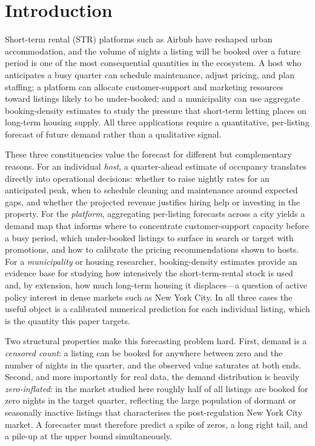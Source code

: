 \documentclass[review,12pt]{elsarticle}
\begin{document}
\linenumbers

\section{Introduction}
Short-term rental (STR) platforms such as Airbnb have reshaped
urban accommodation, and the volume of nights a listing will be booked over a
future period is one of the most consequential quantities in the ecosystem. A
host who anticipates a busy quarter can schedule maintenance, adjust pricing, and
plan staffing; a platform can allocate customer-support and marketing resources
toward listings likely to be under-booked; and a municipality can use aggregate
booking-density estimates to study the pressure that short-term letting places on
long-term housing supply. All three applications require a quantitative,
per-listing forecast of future demand rather than a qualitative signal.

These three constituencies value the forecast for different but complementary
reasons. For an individual \emph{host}, a quarter-ahead estimate of occupancy
translates directly into operational decisions: whether to raise nightly rates for
an anticipated peak, when to schedule cleaning and maintenance around expected
gaps, and whether the projected revenue justifies hiring help or investing in the
property. For the \emph{platform}, aggregating per-listing forecasts across a city
yields a demand map that informs where to concentrate customer-support capacity
before a busy period, which under-booked listings to surface in search or target
with promotions, and how to calibrate the pricing recommendations shown to hosts.
For a \emph{municipality} or housing researcher, booking-density estimates provide
an evidence base for studying how intensively the short-term-rental stock is used
and, by extension, how much long-term housing it displaces---a question of active
policy interest in dense markets such as New York City. In all three cases the
useful object is a calibrated numerical prediction for each individual listing,
which is the quantity this paper targets.

Two structural properties make this forecasting problem hard. First, demand is a
\emph{censored count}: a listing can be booked for anywhere between zero and the
number of nights in the quarter, and the observed value saturates at both ends.
Second, and more importantly for real data, the demand distribution is heavily
\emph{zero-inflated}: in the market studied here roughly half of all listings are
booked for zero nights in the target quarter, reflecting the large population of
dormant or seasonally inactive listings that characterises the post-regulation New
York City market. A forecaster must therefore predict a spike of zeros, a long
right tail, and a pile-up at the upper bound simultaneously.
\end{document}
